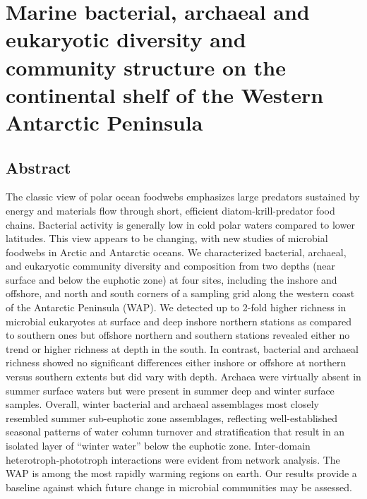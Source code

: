 
\chapter{Marine bacterial, archaeal and eukaryotic diversity and community structure on the continental shelf of the Western Antarctic Peninsula}\label{ch:mirada}


\section{Abstract}\label{sc:abstract}

The classic view of polar ocean foodwebs emphasizes large predators sustained by energy and materials flow through short, efficient diatom-krill-predator food chains. Bacterial activity is generally low in cold polar waters compared to lower latitudes. This view appears to be changing, with new studies of microbial foodwebs in Arctic and Antarctic oceans. We characterized bacterial, archaeal, and eukaryotic community diversity and composition from two depths (near surface and below the euphotic zone) at four sites, including the inshore and offshore, and north and south corners of a sampling grid along the western coast of the Antarctic Peninsula (WAP). We detected up to 2-fold higher richness in microbial eukaryotes at surface and deep inshore northern stations as compared to southern ones but offshore northern and southern stations revealed either no trend or higher richness at depth in the south. In contrast, bacterial and archaeal richness showed no significant differences either inshore or offshore at northern versus southern extents but did vary with depth. Archaea were virtually absent in summer surface waters but were present in summer deep and winter surface samples. Overall, winter bacterial and archaeal assemblages most closely resembled summer sub-euphotic zone assemblages, reflecting well-established seasonal patterns of water column turnover and stratification that result in an isolated layer of ``winter water'' below the euphotic zone. Inter-domain heterotroph-phototroph interactions were evident from network analysis. The WAP is among the most rapidly warming regions on earth. Our results provide a baseline against which future change in microbial communities may be assessed.

